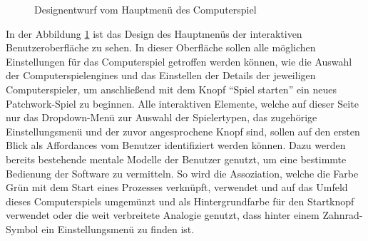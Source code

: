 \begin{figure}[!ht]
    \centering
    \caption{Designentwurf vom Hauptmenü des Computerspiel}
    \label{fig:design-main-ui}
\end{figure}

In der Abbildung \ref{fig:design-main-ui} ist das Design des Hauptmenüs der interaktiven Benutzeroberfläche zu sehen. In dieser Oberfläche sollen alle möglichen Einstellungen für das Computerspiel getroffen werden können, wie die Auswahl der Computerspielengines und das Einstellen der Details der jeweiligen Computerspieler, um anschließend mit dem Knopf \enquote{Spiel starten} ein neues Patchwork-Spiel zu beginnen. Alle interaktiven Elemente, welche auf dieser Seite nur das Dropdown-Menü zur Auswahl der Spielertypen, das zugehörige Einstellungsmenü und der zuvor angesprochene Knopf sind, sollen auf den ersten Blick als Affordances vom Benutzer identifiziert werden können. Dazu werden bereits bestehende mentale Modelle der Benutzer genutzt, um eine bestimmte Bedienung der Software zu vermitteln. So wird die Assoziation, welche die Farbe Grün mit dem Start eines Prozesses verknüpft, verwendet und auf das Umfeld dieses Computerspiels umgemünzt und als Hintergrundfarbe für den Startknopf verwendet oder die weit verbreitete Analogie genutzt, dass hinter einem Zahnrad-Symbol ein Einstellungsmenü zu finden ist.

